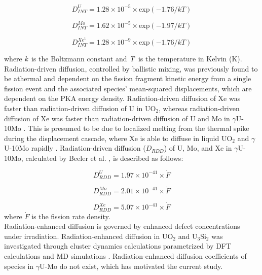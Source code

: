 \documentclass[preprint,12pt]{elsarticle}
\begin{document}
\begin{equation}
D_{INT}^{U} = 1.28\times10^{-5}\times \textrm{exp}(-1.76/kT)
\end{equation}

\begin{equation}
D_{INT}^{Mo} = 1.62\times10^{-5}\times \textrm{exp}(-1.97/kT)
\end{equation}

\begin{equation}
D_{INT}^{Xe^{1}} = 1.28\times10^{-9}\times \textrm{exp}(-1.76/kT)
\end{equation}

\noindent where $\it{k}$ is the Boltzmann constant and $\it{T}$ is the temperature in Kelvin (K).\\
\indent Radiation-driven diffusion, controlled by ballistic mixing, was previously found to be athermal and dependent on the fission fragment kinetic energy from a single fission event and the associated species' mean-squared displacements, which are dependent on the PKA energy density. Radiation-driven diffusion of Xe was faster than radiation-driven diffusion of U in UO$_{2}$, whereas radiation-driven diffusion of Xe was faster than radiation-driven diffusion of U and Mo in $\gamma$U-10Mo \cite{beeler2021radiation, cooper2016simulation}. This is presumed to be due to localized melting from the thermal spike during the displacement cascade, where Xe is able to diffuse in liquid UO$_{2}$ and $\gamma$U-10Mo rapidly \cite{beeler2021radiation, cooper2016simulation}. Radiation-driven diffusion ($D_{RDD}$) of U, Mo, and Xe in $\gamma$U-10Mo, calculated by Beeler et al. \cite{beeler2021radiation}, is described as follows:

\begin{equation}
D_{RDD}^{U} = 1.97\times10^{-41}\times\dot{F}
\end{equation}

\begin{equation}
D_{RDD}^{Mo} = 2.01\times10^{-41}\times\dot{F}
\end{equation}

\begin{equation}
D_{RDD}^{Xe} = 5.07\times10^{-41}\times\dot{F}
\end{equation}
where $\dot{F}$ is the fission rate density.\\
\indent Radiation-enhanced diffusion is governed by enhanced defect concentrations under irradiation. Radiation-enhanced diffusion in UO$_{2}$ and U$_{3}$Si$_{2}$ was investigated through cluster dynamics calculations parametrized by DFT calculations and MD simulations \cite{perriot2019atomistic, andersson2014atomistic, matthews2020cluster}. Radiation-enhanced diffusion coefficients of species in $\gamma$U-Mo do not exist, which has motivated the current study.
\end{document}
